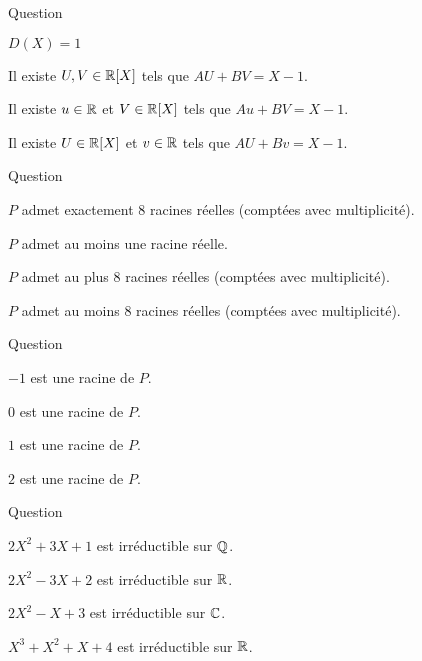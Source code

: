 \begin{multi}[multiple,feedback=
{\(A(X)=X^2(X-1)^2\), \(B(X)=(X-1)(X+2)\), \(D(X)=X-1\). \(U(X)= -\frac14\), \(V(X)=\frac14(X^2-X+2)\) donnent \(AU+BV=D\).
}]{Question}
    \item \(D(X) = 1\)
    \item* Il existe \(U,V \in \mathbb{R}[X]\) tels que \(AU+BV = X-1\).
    \item* Il existe \(u \in \mathbb{R}\) et \(V \in \mathbb{R}[X]\) tels que \(Au+BV = X-1\).
    \item Il existe \(U\in \mathbb{R}[X]\) et \(v \in \mathbb{R}\) tels que \(AU+Bv = X-1\).
\end{multi}


\begin{multi}[multiple,feedback=
{Il y a au plus \(\deg P\) racines réelles (comptées avec multiplicité).
}]{Question}
    \item \(P\) admet exactement \(8\) racines réelles (comptées avec multiplicité).
    \item \(P\) admet au moins une racine réelle.
    \item* \(P\) admet au plus \(8\) racines réelles (comptées avec multiplicité).
    \item \(P\) admet au moins \(8\) racines réelles (comptées avec multiplicité).
\end{multi}


\begin{multi}[multiple,feedback=
{Calculer \(P(\alpha)\). En fait \(P(X) = (X-2)^2(X+1)^3(X^2+X+1)\).
}]{Question}
    \item* \(-1\) est une racine de \(P\).
    \item \(0\) est une racine de \(P\).
    \item \(1\) est une racine de \(P\).
    \item* \(2\) est une racine de \(P\).
\end{multi}


\begin{multi}[multiple,feedback=
{Sur \(\Cc\) les irréductibles sont de degré \(1\). Sur \(\Rr\) ils sont de degré 1, ou bien de degré \(2\) à discriminant strictement négatif.
}]{Question}
    \item \(2X^2+3X+1\) est irréductible sur \(\mathbb{Q}\).
    \item* \(2X^2-3X+2\) est irréductible sur \(\Rr\).
    \item \(2X^2-X+3\) est irréductible sur \(\Cc\).
    \item \(X^3+X^2+X+4\) est irréductible sur \(\Rr\).
\end{multi}


